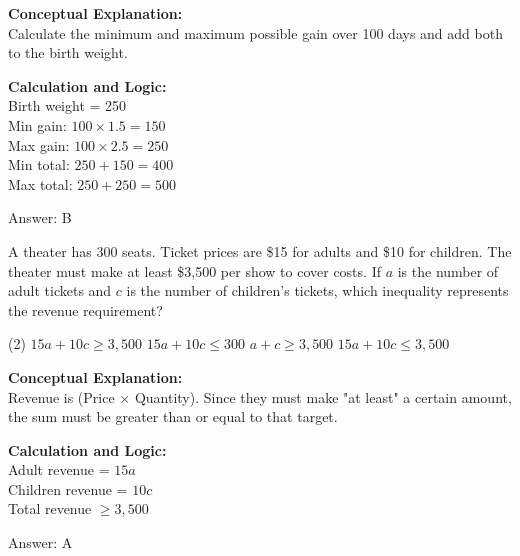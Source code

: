 \documentclass[11pt,paper=a4,answers]{exam}
\begin{document}
\begin{questions}
\begin{solution}
\textbf{Conceptual Explanation:} \\
Calculate the minimum and maximum possible gain over 100 days and add both to the birth weight.

\vspace{10pt}
\textbf{Calculation and Logic:} \\
Birth weight = 250 \\
Min gain: $100 \times 1.5 = 150$ \\
Max gain: $100 \times 2.5 = 250$ \\
Min total: $250 + 150 = 400$ \\
Max total: $250 + 250 = 500$

\vspace{15pt}
Answer: \colorbox{yellow!100}{B}
\end{solution}

\vspace{20pt}

\question
A theater has 300 seats. Ticket prices are \$15 for adults and \$10 for children. The theater must make at least \$3,500 per show to cover costs. If $a$ is the number of adult tickets and $c$ is the number of children's tickets, which inequality represents the revenue requirement?
\begin{tasks}(2)
    \task $15a + 10c \ge 3,500$
    \task $15a + 10c \le 300$
    \task $a + c \ge 3,500$
    \task $15a + 10c \le 3,500$
\end{tasks}

\begin{solution}
\textbf{Conceptual Explanation:} \\
Revenue is (Price $\times$ Quantity). Since they must make "at least" a certain amount, the sum must be greater than or equal to that target.

\vspace{10pt}
\textbf{Calculation and Logic:} \\
Adult revenue = $15a$ \\
Children revenue = $10c$ \\
Total revenue $\ge 3,500$

\vspace{15pt}
Answer: \colorbox{yellow!100}{A}
\end{solution}

\vspace{20pt}


\end{questions}
\end{document}
